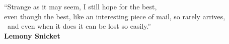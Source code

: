 
\pretextualchapter{}
\vspace{8cm}
\begin{flushright}
\textnormal{``Strange as it may seem, I still hope for the best,\\
even though the best, like an interesting piece of mail, so rarely arrives,\\\ and even when it does it can be lost so easily.'' \\
	\bfseries Lemony Snicket}
\end{flushright}

